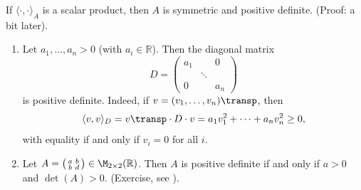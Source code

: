 \begin{claim*}
\label{claim:scalar_product_forces_pos_def}
    If $\langle \cdot, \cdot \rangle_A$ is a scalar product, then $A$ is symmetric and positive definite. (Proof: a bit later).
\end{claim*}

\begin{example}
\label{ex:pos_def_examples_real}
\begin{enumerate}[label=\textbf{(\alph*)}]
    \item Let $a_1, \dots, a_n > 0$ (with $a_i \in \mathbb{R}$). Then the diagonal matrix
    \[
        D = \begin{pmatrix} a_1 & & 0 \\ & \ddots & \\ 0 & & a_n \end{pmatrix}
    \]
    is positive definite. Indeed, if $v = (v_1, \dots, v_n)\transp$, then
    \[
        \langle v, v \rangle_D = v\transp \cdot D \cdot v = a_1 v_1^2 + \dots + a_n v_n^2 \geq 0,
    \]
    with equality if and only if $v_i = 0$ for all $i$.
    \item Let $A = \left(\begin{smallmatrix} a & b \\ b & d \end{smallmatrix}\right) \in \M_{2 \times 2}(\mathbb{R})$. Then $A$ is positive definite if and only if $a > 0$ and $\det(A) > 0$. (Exercise, see ).
\end{enumerate}
\end{example}

